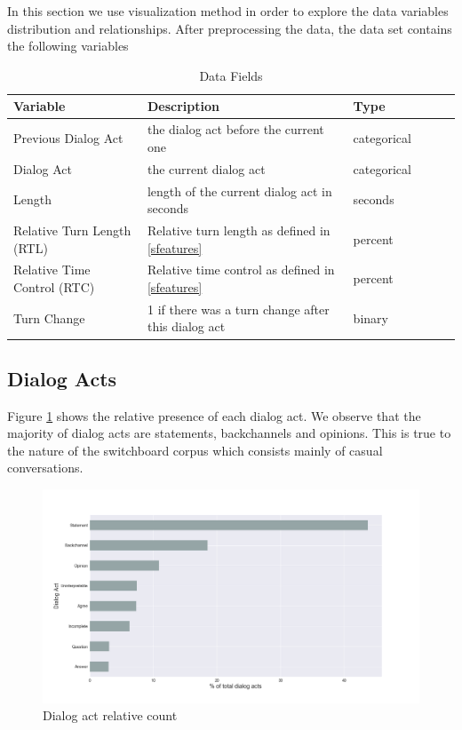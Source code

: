 In this section we use visualization method in order to explore the data variables
distribution and relationships.
%
After preprocessing the data, the data set contains the following variables

\begin{table}[ht!]
\begin{center}
\begin{tabular}{llllrr}
\toprule
Variable &  Description & Type &\\
\midrule
     Previous Dialog Act & the dialog act before the current one  & categorical\\
     Dialog Act & the current dialog act & categorical \\
     Length & length of the current dialog act in seconds & seconds \\
     Relative Turn Length (RTL)  & Relative turn length as defined in \ref{sfeatures} & percent \\
     Relative Time Control (RTC) & Relative time control as defined in \ref{sfeatures} & percent \\
     Turn Change & 1 if there was a turn change after this dialog act & binary \\
\bottomrule
\end{tabular}
\end{center}
\caption{Data Fields}
\end{table}


\subsection{Dialog Acts}

Figure \ref{f1} shows the relative presence of each dialog act. We observe that the majority of dialog acts are statements, backchannels and opinions. This is true to the nature of the switchboard corpus
which consists mainly of casual conversations.

 \begin{figure}[ht!]
 \centering
 \includegraphics[width=\textwidth]{../scikitlearn/figures/f1.png}
 \caption{Dialog act relative count\label{overflow}}
 \label{f1}
 \end{figure}

